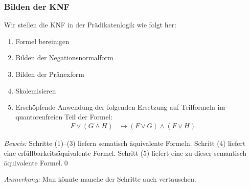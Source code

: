 \documentclass[onlymath]{beamer}
\begin{document}
\begin{frame}\frametitle{Bilden der KNF}

Wir stellen die KNF in der Prädikatenlogik wie folgt her:
\begin{enumerate}[(1)]
\item Formel bereinigen
\item Bilden der Negationsnormalform
\item Bilden der Pränexform
\item Skolemisieren
\item Erschöpfende Anwendung der folgenden Ersetzung auf Teilformeln im quantorenfreien Teil der Formel:
\begin{align*}
F\vee(G\wedge H) &\mapsto (F\vee G)\wedge (F\vee H)
\end{align*}
\end{enumerate}\pause


\emph{Beweis:} Schritte (1)--(3) liefern sematisch äquivalente Formeln. Schritt (4) liefert eine erfüllbarkeitsäquivalente Formel. Schritt (5) liefert eine zu dieser semantisch äquivalente Formel.\qed\medskip

\emph{Anmerkung:} Man könnte manche der Schritte auch vertauschen.

\end{frame}
\end{document}
